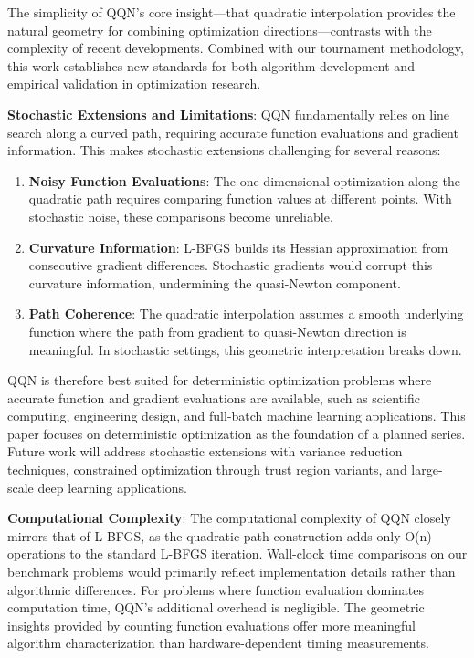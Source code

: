 The simplicity of QQN's core insight---that quadratic interpolation provides the natural geometry for combining optimization directions---contrasts with the complexity of recent developments.
Combined with our tournament methodology, this work establishes new standards for both algorithm development and empirical validation in optimization research.

\textbf{Stochastic Extensions and Limitations}: QQN fundamentally relies on line search along a curved path, requiring accurate function evaluations and gradient information. This makes stochastic extensions challenging for several reasons:

\begin{enumerate}
\def\labelenumi{\arabic{enumi}.}
\item
  \textbf{Noisy Function Evaluations}: The one-dimensional optimization along the quadratic path requires comparing function values at different points. With stochastic noise, these comparisons become unreliable.
\item
  \textbf{Curvature Information}: L-BFGS builds its Hessian approximation from consecutive gradient differences. Stochastic gradients would corrupt this curvature information, undermining the quasi-Newton component.
\item
  \textbf{Path Coherence}: The quadratic interpolation assumes a smooth underlying function where the path from gradient to quasi-Newton direction is meaningful. In stochastic settings, this geometric interpretation breaks down.
\end{enumerate}

QQN is therefore best suited for deterministic optimization problems where accurate function and gradient evaluations are available, such as scientific computing, engineering design, and full-batch machine learning applications. This paper focuses on deterministic optimization as the foundation of a planned series. Future work will address stochastic extensions with variance reduction techniques, constrained optimization through trust region variants, and large-scale deep learning applications.

\textbf{Computational Complexity}: The computational complexity of QQN closely mirrors that of L-BFGS, as the quadratic path construction adds only O(n) operations to the standard L-BFGS iteration.
Wall-clock time comparisons on our benchmark problems would primarily reflect implementation details rather than algorithmic differences.
For problems where function evaluation dominates computation time, QQN's additional overhead is negligible.
The geometric insights provided by counting function evaluations offer more meaningful algorithm characterization than hardware-dependent timing measurements.

